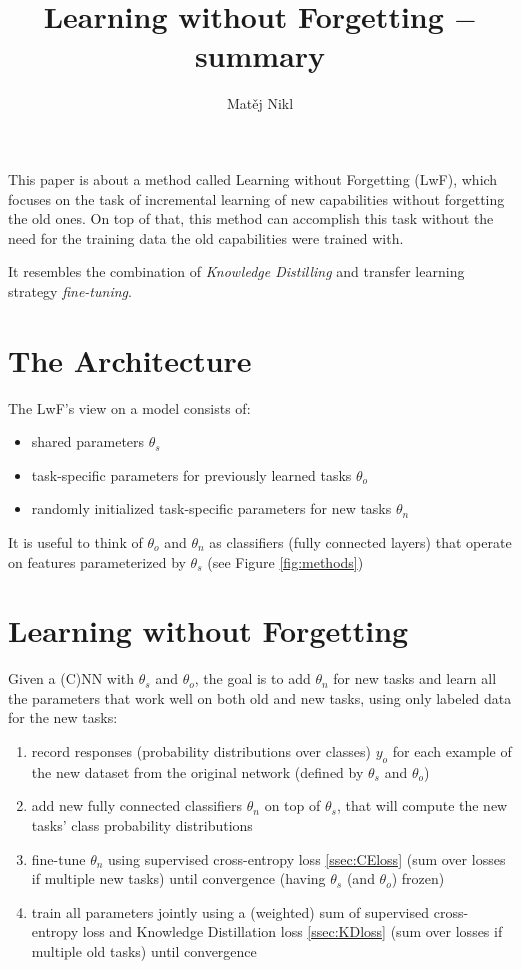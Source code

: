 \documentclass[a4paper,twocolumn]{article}
\title{Learning without Forgetting $-$ summary}
\author{Matěj Nikl}
\begin{document}
\maketitle
This paper is about a method called Learning without Forgetting (LwF), which focuses on the task of incremental learning of new capabilities without forgetting the old ones. On top of that, this method can accomplish this task without the need for the training data the old capabilities were trained with.

It resembles the combination of \textit{Knowledge Distilling} and transfer learning strategy \textit{fine-tuning}.

\section{The Architecture}
The LwF's view on a model consists of:
\begin{itemize}
    \item shared parameters $\theta_s$
    \item task-specific parameters for previously learned tasks $\theta_o$
    \item randomly initialized task-specific parameters for new tasks $\theta_n$
\end{itemize}
It is useful to think of $\theta_o$ and $\theta_n$ as classifiers (fully connected layers) that operate on features parameterized by $\theta_s$ (see Figure \ref{fig:methods})

\section{Learning without Forgetting}
Given a (C)NN with $\theta_s$ and $\theta_o$, the goal is to add $\theta_n$ for new tasks and learn all the parameters that work well on both old and new tasks, using only labeled data for the new tasks:
\begin{enumerate}
    \item record responses (probability distributions over classes) $y_o$ for each example of the new dataset from the original network (defined by $\theta_s$ and $\theta_o$)
    \item add new fully connected classifiers $\theta_n$ on top of $\theta_s$, that will compute the new tasks' class probability distributions
    \item fine-tune $\theta_n$ using supervised cross-entropy loss \ref{ssec:CEloss} (sum over losses if multiple new tasks) until convergence (having $\theta_s$ (and $\theta_o$) frozen)
    \item train all parameters jointly using a (weighted) sum of supervised cross-entropy loss and Knowledge Distillation loss \ref{ssec:KDloss} (sum over losses if multiple old tasks) until convergence
\end{enumerate}
\end{document}
